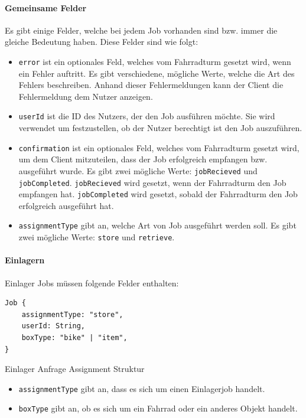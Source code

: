 \paragraph{Gemeinsame Felder}

Es gibt einige Felder, welche bei jedem Job vorhanden sind bzw. immer die gleiche Bedeutung haben. Diese Felder sind wie folgt:

\begin{itemize}
  \item \texttt{error} ist ein optionales Feld, welches vom Fahrradturm gesetzt wird, wenn ein Fehler auftritt. Es gibt verschiedene, mögliche Werte, welche die Art des Fehlers beschreiben. Anhand dieser Fehlermeldungen kann der Client die Fehlermeldung dem Nutzer anzeigen.
  \item \texttt{userId} ist die ID des Nutzers, der den Job ausführen möchte. Sie wird verwendet um festzustellen, ob der Nutzer berechtigt ist den Job auszuführen.
  \item \texttt{confirmation} ist ein optionales Feld, welches vom Fahrradturm gesetzt wird, um dem Client mitzuteilen, dass der Job erfolgreich empfangen bzw. ausgeführt wurde. Es gibt zwei mögliche Werte: \texttt{jobRecieved} und \texttt{jobCompleted}. \texttt{jobRecieved} wird gesetzt, wenn der Fahrradturm den Job empfangen hat. \texttt{jobCompleted} wird gesetzt, sobald der Fahrradturm den Job erfolgreich ausgeführt hat.
  \item \texttt{assignmentType} gibt an, welche Art von Job ausgeführt werden soll. Es gibt zwei mögliche Werte: \texttt{store} und \texttt{retrieve}.
\end{itemize}


\paragraph{Einlagern}

Einlager Jobs müssen folgende Felder enthalten:

\begin{listing}[H]
  \begin{verbatim}
Job {
    assignmentType: "store",
    userId: String,
    boxType: "bike" | "item",
}
\end{verbatim}
  \caption{Einlager Anfrage Assignment Struktur}
  \label{lst:einlager_assignment_struktur}
\end{listing}

\begin{itemize}
  \item \texttt{assignmentType} gibt an, dass es sich um einen Einlagerjob handelt.
  \item \texttt{boxType} gibt an, ob es sich um ein Fahrrad oder ein anderes Objekt handelt.
\end{itemize}

